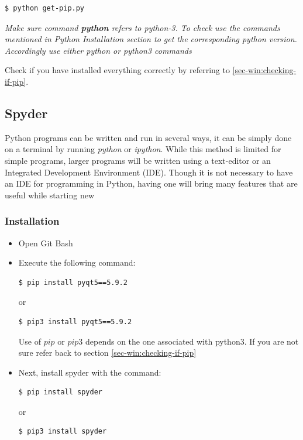 \documentclass{cmc}
\begin{document}
\begin{lstlisting}[language=bash]
$ python get-pip.py
\end{lstlisting}

\textbf{}\textit{Make sure command \textbf{python}
  refers to python-3. To check use the commands mentioned in Python
  Installation section to get the corresponding python version.
  Accordingly use either python or python3 commands}

Check if you have installed everything correctly by referring to
\ref{sec-win:checking-if-pip}.

\subsection{Spyder}
\label{sec-win:spyder}

Python programs can be written and run in several ways, it can be
simply done on a terminal by running \textit{python} or
\textit{ipython}. While this method is limited for simple programs,
larger programs will be written using a text-editor or an Integrated
Development Environment (IDE). Though it is not necessary to have an
IDE for programming in Python, having one will bring many features
that are useful while starting new

\subsubsection{Installation}
\label{sec-win:installation-spyder}

\begin{itemize}
\item Open Git Bash
\item Execute the following command:
\begin{lstlisting}[language=bash]
$ pip install pyqt5==5.9.2
\end{lstlisting}
  or
\begin{lstlisting}[language=bash]
$ pip3 install pyqt5==5.9.2
\end{lstlisting}
  Use of $pip$ or $pip3$ depends on the one associated with python3.
  If you are not sure refer back to section
  \ref{sec-win:checking-if-pip}
\item Next, install spyder with the command:
\begin{lstlisting}[language=bash]
$ pip install spyder
\end{lstlisting}
  or
\begin{lstlisting}[language=bash]
$ pip3 install spyder
\end{lstlisting}
\end{itemize}
\end{document}
